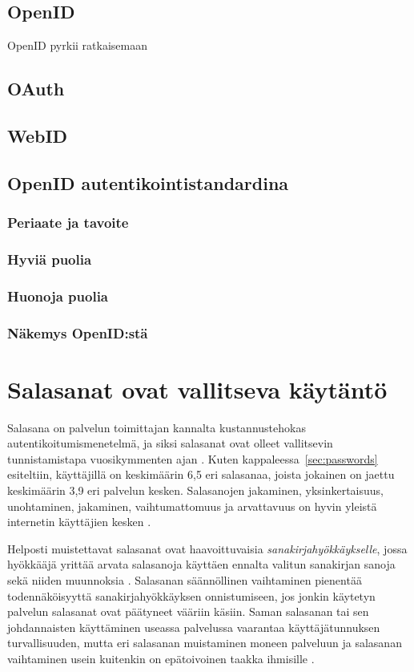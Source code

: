 \documentclass{tktltiki}
\begin{document}
\subsection{OpenID}
OpenID pyrkii ratkaisemaan 
\subsection{OAuth}
\subsection{WebID}
\subsection{OpenID autentikointistandardina}
\subsubsection{Periaate ja tavoite}
\subsubsection{Hyviä puolia}
\subsubsection{Huonoja puolia}
\subsubsection{Näkemys OpenID:stä}

\section{Salasanat ovat vallitseva käytäntö}

Salasana on palvelun toimittajan kannalta kustannustehokas autentikoitumismenetelmä, ja siksi salasanat ovat olleet vallitsevin tunnistamistapa vuosikymmenten ajan \cite{pw_auth_system_perspective_08}. Kuten kappaleessa~\ref{sec:passwords} esiteltiin, käyttäjillä on keskimäärin 6,5 eri salasanaa, joista jokainen on jaettu keskimäärin 3,9 eri palvelun kesken. Salasanojen jakaminen, yksinkertaisuus, unohtaminen, jakaminen, vaihtumattomuus ja arvattavuus on hyvin yleistä internetin käyttäjien kesken \cite{study_of_passwords_07, pw_auth_system_perspective_08, passpet_06}.

Helposti muistettavat salasanat ovat haavoittuvaisia \emph{sanakirjahyökkäykselle}, jossa hyökkääjä yrittää arvata salasanoja käyttäen ennalta valitun sanakirjan sanoja sekä niiden muunnoksia \cite{passpet_06}. Salasanan säännöllinen vaihtaminen pienentää todennäköisyyttä sanakirjahyökkäyksen onnistumiseen, jos jonkin käytetyn palvelun salasanat ovat päätyneet vääriin käsiin. Saman salasanan tai sen johdannaisten käyttäminen useassa palvelussa vaarantaa käyttäjätunnuksen turvallisuuden, mutta eri salasanan muistaminen moneen palveluun ja salasanan vaihtaminen usein kuitenkin on epätoivoinen taakka ihmisille \cite{passpet_06, pw_auth_system_perspective_08}.
\end{document}
